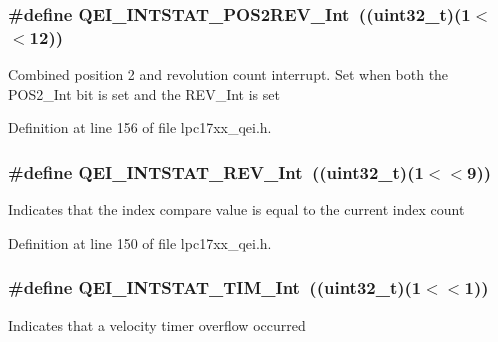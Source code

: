\hypertarget{group___q_e_i___private___macros_ga6553c523406e9e9c304b221aa626971d}{
\subsubsection[{\-Q\-E\-I\-\_\-\-I\-N\-T\-S\-T\-A\-T\-\_\-\-P\-O\-S2\-R\-E\-V\-\_\-\-Int}]{\setlength{\rightskip}{0pt plus 5cm}\#define {\bf \-Q\-E\-I\-\_\-\-I\-N\-T\-S\-T\-A\-T\-\_\-\-P\-O\-S2\-R\-E\-V\-\_\-\-Int}~((uint32\-\_\-t)(1$<$$<$12))}}\label{group___q_e_i___private___macros_ga6553c523406e9e9c304b221aa626971d}
\-Combined position 2 and revolution count interrupt. \-Set when both the \-P\-O\-S2\-\_\-\-Int bit is set and the \-R\-E\-V\-\_\-\-Int is set 

\-Definition at line 156 of file lpc17xx\-\_\-qei.\-h.

\hypertarget{group___q_e_i___private___macros_ga6d6d1b319f14cc3fcfc120a5d122b71a}{
\subsubsection[{\-Q\-E\-I\-\_\-\-I\-N\-T\-S\-T\-A\-T\-\_\-\-R\-E\-V\-\_\-\-Int}]{\setlength{\rightskip}{0pt plus 5cm}\#define {\bf \-Q\-E\-I\-\_\-\-I\-N\-T\-S\-T\-A\-T\-\_\-\-R\-E\-V\-\_\-\-Int}~((uint32\-\_\-t)(1$<$$<$9))}}\label{group___q_e_i___private___macros_ga6d6d1b319f14cc3fcfc120a5d122b71a}
\-Indicates that the index compare value is equal to the current index count 

\-Definition at line 150 of file lpc17xx\-\_\-qei.\-h.

\hypertarget{group___q_e_i___private___macros_gab4188cd3d0d9e76a753a82b6b2e44274}{
\subsubsection[{\-Q\-E\-I\-\_\-\-I\-N\-T\-S\-T\-A\-T\-\_\-\-T\-I\-M\-\_\-\-Int}]{\setlength{\rightskip}{0pt plus 5cm}\#define {\bf \-Q\-E\-I\-\_\-\-I\-N\-T\-S\-T\-A\-T\-\_\-\-T\-I\-M\-\_\-\-Int}~((uint32\-\_\-t)(1$<$$<$1))}}\label{group___q_e_i___private___macros_gab4188cd3d0d9e76a753a82b6b2e44274}
\-Indicates that a velocity timer overflow occurred 

